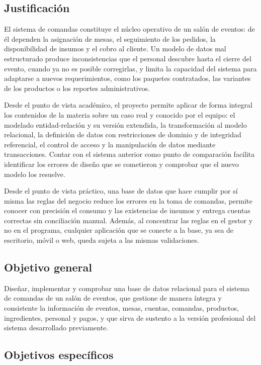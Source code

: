 \subsection{Justificación}

El sistema de comandas constituye el núcleo operativo de un salón de eventos: de él dependen la asignación de mesas, el seguimiento de los pedidos, la disponibilidad de insumos y el cobro al cliente. Un modelo de datos mal estructurado produce inconsistencias que el personal descubre hasta el cierre del evento, cuando ya no es posible corregirlas, y limita la capacidad del sistema para adaptarse a nuevos requerimientos, como los paquetes contratados, las variantes de los productos o los reportes administrativos.

Desde el punto de vista académico, el proyecto permite aplicar de forma integral los contenidos de la materia sobre un caso real y conocido por el equipo: el modelado entidad-relación y su versión extendida, la transformación al modelo relacional, la definición de datos con restricciones de dominio y de integridad referencial, el control de acceso y la manipulación de datos mediante transacciones. Contar con el sistema anterior como punto de comparación facilita identificar los errores de diseño que se cometieron y comprobar que el nuevo modelo los resuelve.

Desde el punto de vista práctico, una base de datos que hace cumplir por sí misma las reglas del negocio reduce los errores en la toma de comandas, permite conocer con precisión el consumo y las existencias de insumos y entrega cuentas correctas sin conciliación manual. Además, al concentrar las reglas en el gestor y no en el programa, cualquier aplicación que se conecte a la base, ya sea de escritorio, móvil o web, queda sujeta a las mismas validaciones.

\subsection{Objetivo general}

Diseñar, implementar y comprobar una base de datos relacional para el sistema de comandas de un salón de eventos, que gestione de manera íntegra y consistente la información de eventos, mesas, cuentas, comandas, productos, ingredientes, personal y pagos, y que sirva de sustento a la versión profesional del sistema desarrollado previamente.

\subsection{Objetivos específicos}

